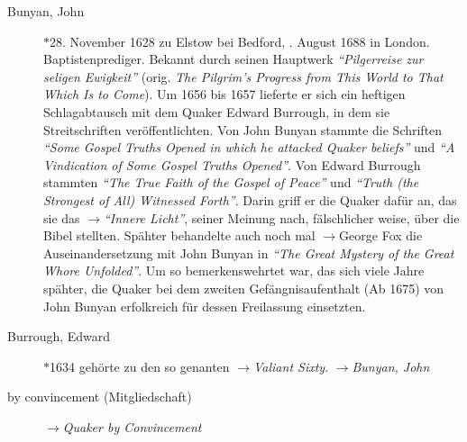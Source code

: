 \begin{description}
 \item[Bunyan, John] $\ast$28. November 1628 zu Elstow bei Bedford, . August 1688 in London. Baptistenprediger. Bekannt durch seinen Hauptwerk \textit{"`Pilgerreise zur seligen Ewigkeit"'} (orig. \textit{The Pilgrim’s Progress from This World to That Which Is to Come}). Um 1656 bis 1657 lieferte er sich ein heftigen Schlagabtausch mit dem Quaker Edward Burrough, in dem sie Streitschriften veröffentlichten. Von John Bunyan stammte die Schriften \textit{"`Some Gospel Truths Opened in which he attacked Quaker beliefs"'} und \textit{"`A Vindication of Some Gospel Truths Opened"'}. Von Edward Burrough stammten \textit{"`The True Faith of the Gospel of Peace"'} und \textit{"`Truth (the Strongest of All) Witnessed Forth"'}. Darin griff er die Quaker dafür an, das sie das $\to$\textit{"`Innere Licht"'}, seiner Meinung nach, fälschlicher weise, über die Bibel stellten. Spähter behandelte auch noch mal $\to$George Fox die Auseinandersetzung mit John Bunyan in \textit{"`The Great Mystery of the Great Whore Unfolded"'}. Um so bemerkenswehrtet war, das sich viele Jahre spähter, die Quaker bei dem zweiten Gefängnisaufenthalt (Ab 1675) von John Bunyan erfolkreich für dessen Freilassung einsetzten.

 \item[Burrough, Edward] $\ast$1634  gehörte zu den so genanten $\to$\textit{Valiant Sixty}. $\to$\textit{Bunyan, John}


 \item[by convincement (Mitgliedschaft)] $\to$\textit{Quaker by Convincement}
 \end{description}

\normalsize

